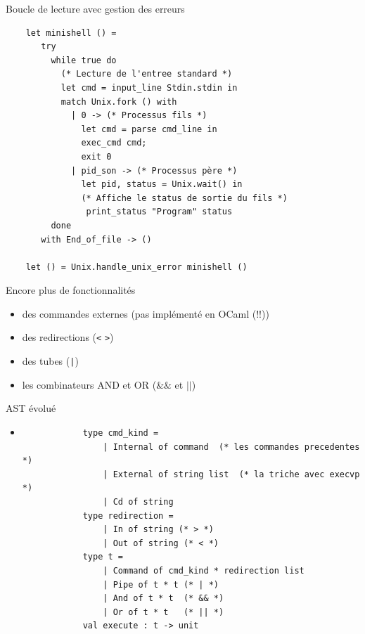 \begin{frame}[fragile]{Boucle de lecture avec gestion des erreurs}
\begin{lstlisting}
    let minishell () =
       try
         while true do
           (* Lecture de l'entree standard *)
           let cmd = input_line Stdin.stdin in
           match Unix.fork () with
             | 0 -> (* Processus fils *)
               let cmd = parse cmd_line in
               exec_cmd cmd;
               exit 0
             | pid_son -> (* Processus père *)
               let pid, status = Unix.wait() in
               (* Affiche le status de sortie du fils *)
                print_status "Program" status
         done
       with End_of_file -> ()

    let () = Unix.handle_unix_error minishell ()
\end{lstlisting}
\end{frame}
\begin{frame}{Encore plus de fonctionnalités}
  \begin{itemize}[label=\small{}]
  \item des commandes externes (pas implémenté en OCaml (!!))
  \item des redirections (\texttt{<} \texttt{>})
  \item des tubes  (\texttt{|})
  \item les combinateurs AND et OR  (\texttt{$\&\&$} et \texttt{$||$})
  \end{itemize}
\end{frame}

\begin{frame}[fragile]{AST évolué}
    \begin{itemize}[leftmargin=-10pt]
         \item
        \begin{lstlisting}
            type cmd_kind =
                | Internal of command  (* les commandes precedentes *)
                | External of string list  (* la triche avec execvp *)
                | Cd of string
            type redirection =
                | In of string (* > *)
                | Out of string (* < *)
            type t =
                | Command of cmd_kind * redirection list
                | Pipe of t * t (* | *)
                | And of t * t  (* && *)
                | Or of t * t   (* || *)
            val execute : t -> unit
        \end{lstlisting}
    \end{itemize}
\end{frame}

